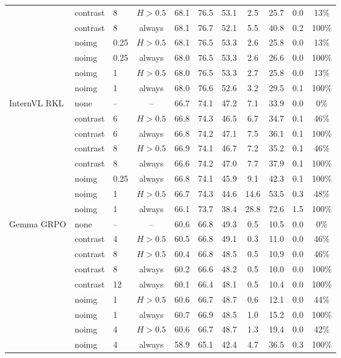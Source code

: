 \begin{table}[p]
\begin{tabular}{lllcccccccc}
 & contrast & 8 & $H{>}0.5$ & 68.1 & 76.5 & 53.1 & 2.5 & 25.7 & 0.0 & 13\% \\
 & contrast & 8 & always & 68.1 & 76.7 & 52.1 & 5.5 & 40.8 & 0.2 & 100\% \\
 & noimg & 0.25 & $H{>}0.5$ & 68.1 & 76.5 & 53.3 & 2.6 & 25.8 & 0.0 & 13\% \\
 & noimg & 0.25 & always & 68.0 & 76.5 & 53.3 & 2.6 & 26.6 & 0.0 & 100\% \\
 & noimg & 1 & $H{>}0.5$ & 68.0 & 76.5 & 53.3 & 2.7 & 25.8 & 0.0 & 13\% \\
 & noimg & 1 & always & 68.0 & 76.6 & 52.6 & 3.2 & 29.5 & 0.1 & 100\% \\
\midrule
InternVL RKL & none & -- & -- & 66.7 & 74.1 & 47.2 & 7.1 & 33.9 & 0.0 & 0\% \\
 & contrast & 6 & $H{>}0.5$ & 66.8 & 74.3 & 46.5 & 6.7 & 34.7 & 0.1 & 46\% \\
 & contrast & 6 & always & 66.8 & 74.2 & 47.1 & 7.5 & 36.1 & 0.1 & 100\% \\
 & contrast & 8 & $H{>}0.5$ & 66.9 & 74.1 & 46.7 & 7.2 & 35.2 & 0.1 & 46\% \\
 & contrast & 8 & always & 66.6 & 74.2 & 47.0 & 7.7 & 37.9 & 0.1 & 100\% \\
 & noimg & 0.25 & always & 66.8 & 74.1 & 45.9 & 9.1 & 42.3 & 0.1 & 100\% \\
 & noimg & 1 & $H{>}0.5$ & 66.7 & 74.3 & 44.6 & 14.6 & 53.5 & 0.3 & 48\% \\
 & noimg & 1 & always & 66.1 & 73.7 & 38.4 & 28.8 & 72.6 & 1.5 & 100\% \\
\midrule
Gemma GRPO & none & -- & -- & 60.6 & 66.8 & 49.3 & 0.5 & 10.5 & 0.0 & 0\% \\
 & contrast & 4 & $H{>}0.5$ & 60.5 & 66.8 & 49.1 & 0.3 & 11.0 & 0.0 & 46\% \\
 & contrast & 8 & $H{>}0.5$ & 60.4 & 66.8 & 48.5 & 0.5 & 10.9 & 0.0 & 46\% \\
 & contrast & 8 & always & 60.2 & 66.6 & 48.2 & 0.5 & 10.0 & 0.0 & 100\% \\
 & contrast & 12 & always & 60.1 & 66.4 & 48.1 & 0.5 & 10.4 & 0.0 & 100\% \\
 & noimg & 1 & $H{>}0.5$ & 60.6 & 66.7 & 48.7 & 0.6 & 12.1 & 0.0 & 44\% \\
 & noimg & 1 & always & 60.7 & 66.9 & 48.5 & 1.0 & 15.2 & 0.0 & 100\% \\
 & noimg & 4 & $H{>}0.5$ & 60.6 & 66.7 & 48.7 & 1.3 & 19.4 & 0.0 & 42\% \\
 & noimg & 4 & always & 58.9 & 65.1 & 42.4 & 4.7 & 36.5 & 0.3 & 100\% \\

\end{tabular}
\end{table}
